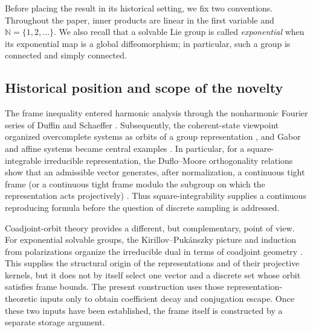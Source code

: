 \documentclass[reqno]{amsart}
\numberwithin{equation}{section}
\theoremstyle{definition}
\theoremstyle{remark}
\newcommand{\N}{\mathbb N}
\begin{document}
Before placing the result in its historical setting, we fix two conventions.
Throughout the paper, inner products are linear in the first variable and
$\N=\{1,2,\ldots\}$.  We also recall that a solvable Lie group is called
\emph{exponential} when its exponential map is a global diffeomorphism; in
particular, such a group is connected and simply connected.

\subsection{Historical position and scope of the novelty}
\label{subsec:history-novelty}

The frame inequality entered harmonic analysis through the nonharmonic
Fourier series of Duffin and Schaeffer \cite{DuffinSchaeffer1952}.
Subsequently, the coherent-state viewpoint organized overcomplete systems as
orbits of a group representation \cite{Perelomov1972}, and Gabor and affine
systems became central examples \cite{DaubechiesGrossmannMeyer1986}.  In
particular, for a square-integrable
irreducible representation, the Duflo--Moore orthogonality relations show that
an admissible vector generates, after normalization, a continuous tight frame
(or a continuous tight frame modulo the subgroup on which the representation
acts projectively) \cite{DufloMoore1976}.  Thus square-integrability supplies
a continuous reproducing formula before the question of discrete sampling is
addressed.

Coadjoint-orbit theory provides a different, but complementary, point of
view.  For exponential solvable
groups, the Kirillov--Puk\'anszky picture and induction from polarizations
organize the irreducible dual in terms of coadjoint geometry
\cite{Pukanszky1968,ArnalCurrey2020}.  This supplies the structural origin of
the representations and of their projective kernels, but it does not by
itself select one vector and a discrete set whose orbit satisfies frame
bounds.  The present construction uses those representation-theoretic inputs
only to obtain coefficient decay and conjugation escape.  Once these two
inputs have been established, the frame itself is constructed by a separate
storage argument.
\end{document}
